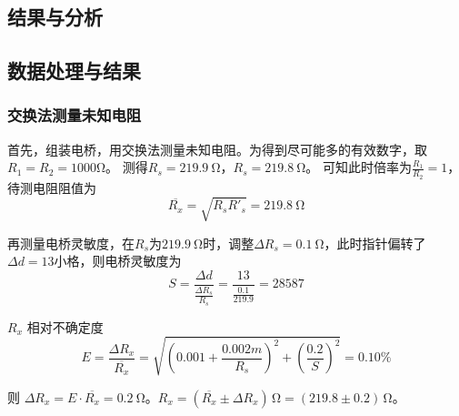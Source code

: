 \documentclass[]{../../templates/Report}%
\begin{document}
\begin{fullreportonly}
    \section{结果与分析}
    \subsection{数据处理与结果}
    \subsubsection{交换法测量未知电阻}
    首先，组装电桥，用交换法测量未知电阻。为得到尽可能多的有效数字，取$R_1=R_2 = 1000 \si{\ohm}$。
    测得$R_s = \SI{219.9}{\ohm}，R_s = \SI{219.8}{\ohm}$。
    可知此时倍率为$\frac{R_1}{R_2} = 1 $，待测电阻阻值为
    \[\overline{R_x} = \sqrt{R_s R'_s} = \SI{219.8}{\ohm}\]

    再测量电桥灵敏度，在$R_s$为$\SI{219.9}{\ohm}$时，调整$\Delta R_s = \SI{0.1}{\ohm}$，此时指针偏转了$\Delta d = 13$小格，则电桥灵敏度为
    \[S = \frac{\Delta d}{\frac{\Delta R_s}{R_s}} = \frac{13}{\frac{0.1}{219.9}} = 28587\]

    $R_x$ 相对不确定度
    \[E = \frac{\Delta R_x}{\overline{R_x}} = \sqrt{\left(0.001+ \frac{0.002m}{R_s}\right)^2 + \left(\frac{0.2}{S}\right)^2} = 0.10\% \]

    则 $\Delta R_x = E \cdot \overline{R_x} = \SI{0.2}{\ohm}$。$R_x = (\overline{R_x} \pm \Delta R_x)\,\si{\ohm} = (219.8 \pm 0.2)\,\si{\ohm}$。

\end{fullreportonly}
\end{document}

